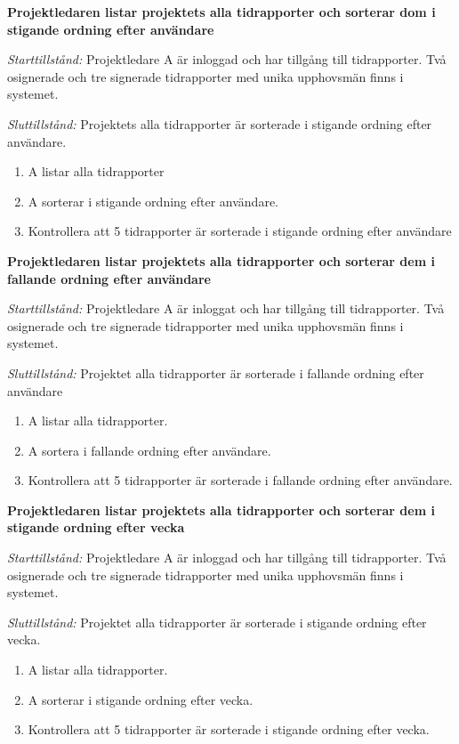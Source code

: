 \documentclass[a4paper]{article}
\begin{document}
\begin{FT}
\item %
\textbf{Projektledaren listar projektets alla tidrapporter och sorterar dom i stigande ordning efter användare}

\emph{Starttillstånd:} Projektledare A är inloggad och har tillgång till tidrapporter. Två osignerade och tre signerade tidrapporter med unika upphovsmän finns i systemet.

\emph{Sluttillstånd:} Projektets alla tidrapporter är sorterade i stigande ordning efter användare.

\begin{enumerate}
\item A listar alla tidrapporter
\item A sorterar i stigande ordning efter användare.
\item Kontrollera att 5 tidrapporter är sorterade i stigande ordning efter användare
\end{enumerate}

\item %
\textbf{Projektledaren listar projektets alla tidrapporter och sorterar dem i fallande ordning efter användare}

\emph{Starttillstånd:} Projektledare A är inloggat och har tillgång till tidrapporter. Två osignerade och tre signerade tidrapporter med unika upphovsmän finns i systemet.

\emph{Sluttillstånd:} Projektet alla tidrapporter är sorterade i fallande ordning efter användare

\begin{enumerate}
\item A listar alla tidrapporter.
\item A sortera i fallande ordning efter användare.
\item Kontrollera att 5 tidrapporter är sorterade i fallande ordning efter användare.
\end{enumerate}

\item %
\textbf{Projektledaren listar projektets alla tidrapporter och sorterar dem i stigande ordning efter vecka}

\emph{Starttillstånd:} Projektledare A är inloggad och har tillgång till tidrapporter. Två osignerade och tre signerade tidrapporter med unika upphovsmän finns i systemet.

\emph{Sluttillstånd:} Projektet alla tidrapporter är sorterade i stigande ordning efter vecka.

\begin{enumerate}
\item A listar alla tidrapporter.
\item A sorterar i stigande ordning efter vecka.
\item Kontrollera att 5 tidrapporter är sorterade i stigande ordning efter vecka.
\end{enumerate}


\end{FT}
\end{document}
